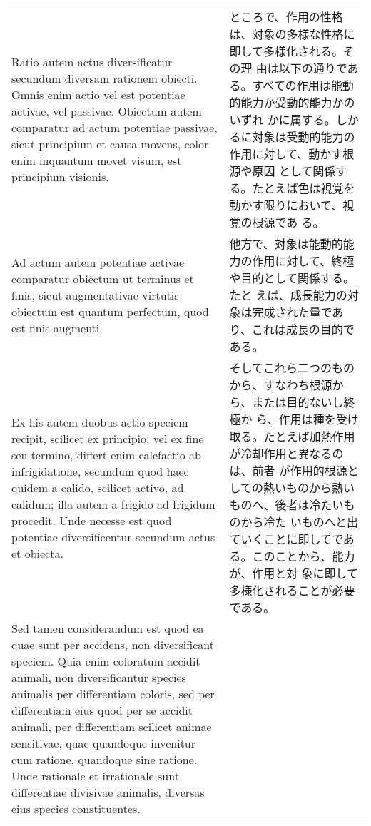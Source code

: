 \documentclass[paper=a4paper,fontsize=10pt,jafontsize=9pt,titlepage]{jlreq}
\begin{document}
\begin{longtable}{p{21em}p{21em}}
\\


 Ratio autem actus diversificatur secundum diversam rationem
 obiecti. Omnis enim actio vel est potentiae activae, vel
 passivae. Obiectum autem comparatur ad actum potentiae passivae,
 sicut principium et causa movens, color enim inquantum movet visum,
 est principium visionis.
 
&

 ところで、作用の性格は、対象の多様な性格に即して多様化される。その理
 由は以下の通りである。すべての作用は能動的能力か受動的能力かのいずれ
 かに属する。しかるに対象は受動的能力の作用に対して、動かす根源や原因
 として関係する。たとえば色は視覚を動かす限りにおいて、視覚の根源であ
 る。

\\

 Ad actum autem potentiae activae comparatur obiectum ut terminus et
 finis, sicut augmentativae virtutis obiectum est quantum perfectum,
 quod est finis augmenti. 
 
 
&

他方で、対象は能動的能力の作用に対して、終極や目的として関係する。たと
えば、成長能力の対象は完成された量であり、これは成長の目的である。

\\

Ex his autem duobus actio speciem recipit, scilicet ex principio, vel
 ex fine seu termino, differt enim calefactio ab infrigidatione,
 secundum quod haec quidem a calido, scilicet activo, ad calidum; illa
 autem a frigido ad frigidum procedit. Unde necesse est quod potentiae
 diversificentur secundum actus et obiecta.



 &

 そしてこれら二つのものから、すなわち根源から、または目的ないし終極か
 ら、作用は種を受け取る。たとえば加熱作用が冷却作用と異なるのは、前者
 が作用的根源としての熱いものから熱いものへ、後者は冷たいものから冷た
 いものへと出ていくことに即してである。このことから、能力が、作用と対
 象に即して多様化されることが必要である。

 \\

  Sed tamen considerandum est quod ea quae sunt per accidens, non
 diversificant speciem. Quia enim coloratum accidit animali, non
 diversificantur species animalis per differentiam coloris, sed per
 differentiam eius quod per se accidit animali, per differentiam
 scilicet animae sensitivae, quae quandoque invenitur cum ratione,
 quandoque sine ratione. Unde rationale et irrationale sunt
 differentiae divisivae animalis, diversas eius species constituentes.
 

\end{longtable}
\end{document}
